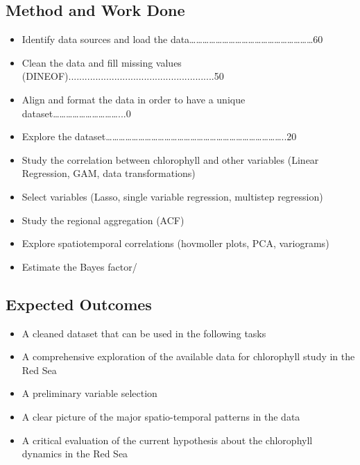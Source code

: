 \subsection{Method and Work Done}

\begin{itemize}
\item Identify data sources and load the data…………………………………………………60%
\item Clean the data and fill missing values (DINEOF)......................................................50%
\item Align and format the data in order to have a unique dataset…………………………...0%
\item Explore the dataset………………………………………………………………………..20%
\item Study the correlation between chlorophyll and other variables (Linear Regression, GAM, data transformations)
\item Select variables (Lasso, single variable regression, multistep regression)
\item Study the regional aggregation (ACF)
\item Explore spatiotemporal correlations (hovmoller plots, PCA, variograms)
\item Estimate the Bayes factor/ %
\end{itemize}

\subsection{Expected Outcomes}

\begin{itemize}
\item A cleaned dataset that can be used in the following tasks
\item A comprehensive exploration of the available data for chlorophyll study in the Red Sea
\item A preliminary variable selection
\item A clear picture of the major spatio-temporal patterns in the data
\item A critical evaluation of the current hypothesis about the chlorophyll dynamics in the Red Sea
\end{itemize}


